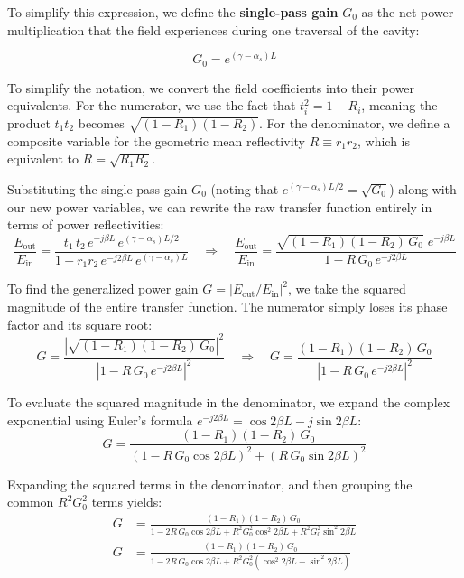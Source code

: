 To simplify this expression, we define the \textbf{single-pass gain} $G_0$ as the net power multiplication that the field experiences during one traversal of the cavity:
\begin{keyresult}
    \begin{equation}
        G_0 = e^{(\gamma-\alpha_s)L}
    \end{equation}
\end{keyresult}

To simplify the notation, we convert the field coefficients into their power equivalents. For the numerator, we use the fact that $t_i^2 = 1 - R_i$, meaning the product $t_1 t_2$ becomes $\sqrt{(1-R_1)(1-R_2)}$. For the denominator, we define a composite variable for the geometric mean reflectivity $R \equiv r_1 r_2$, which is equivalent to $R = \sqrt{R_1 R_2}$.

Substituting the single-pass gain $G_0$ (noting that $e^{(\gamma-\alpha_s)L/2} = \sqrt{G_0}$) along with our new power variables, we can rewrite the raw transfer function entirely in terms of power reflectivities:
\begin{equation*}
    \frac{E_{\text{out}}}{E_{\text{in}}} = \frac{t_1\,t_2\,e^{-j\beta L}\,e^{(\gamma-\alpha_s)L/2}}{1-r_1 r_2\,e^{-j2\beta L}\,e^{(\gamma-\alpha_s)L}} \quad \Rightarrow \quad \frac{E_{\text{out}}}{E_{\text{in}}} = \frac{\sqrt{(1-R_1)(1-R_2)\,G_0}\;e^{-j\beta L}}{1-R\,G_0\,e^{-j2\beta L}}
\end{equation*}

To find the generalized power gain $G = |E_{\text{out}}/E_{\text{in}}|^2$, we take the squared magnitude of the entire transfer function. The numerator simply loses its phase factor and its square root:
\begin{equation*}
    G = \frac{\left|\sqrt{(1-R_1)(1-R_2)\,G_0}\right|^2}{|1 - R\,G_0\,e^{-j2\beta L}|^2} \quad \Rightarrow \quad G = \frac{(1-R_1)(1-R_2)\,G_0}{|1 - R\,G_0\,e^{-j2\beta L}|^2}
\end{equation*}

To evaluate the squared magnitude in the denominator, we expand the complex exponential using Euler's formula $e^{-j2\beta L} = \cos 2\beta L - j\sin 2\beta L$:
\begin{equation*}
    G = \frac{(1-R_1)(1-R_2)\,G_0}{(1 - R\,G_0 \cos 2\beta L)^2 + (R\,G_0 \sin 2\beta L)^2}
\end{equation*}

Expanding the squared terms in the denominator, and then grouping the common $R^2 G_0^2$ terms yields:
\begin{align*}
    G & = \frac{(1-R_1)(1-R_2)\,G_0}{1 - 2 R\,G_0 \cos 2\beta L + R^2 G_0^2 \cos^2 2\beta L + R^2 G_0^2 \sin^2 2\beta L} \\[1em]
    G & = \frac{(1-R_1)(1-R_2)\,G_0}{1 - 2 R\,G_0 \cos 2\beta L + R^2 G_0^2 (\cos^2 2\beta L + \sin^2 2\beta L)}
\end{align*}

